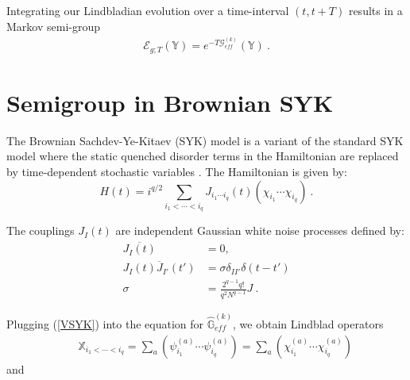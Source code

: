\documentclass{article}
\theoremstyle{definition}
\newcommand{\nn}{\nonumber}
\newcommand{\lb}{\left(}
\newcommand{\rb}{\right)}
\begin{document}
    Integrating our Lindbladian evolution over a time-interval $(t,t+T)$ results
    in a Markov semi-group
    \begin{eqnarray}
        \mathcal{E}_{g;T}(\mathbb{Y})=e^{-T\mathcal{G}_{eff}^{(k)}}(\mathbb{Y})\ .
    \end{eqnarray}

    \section{Semigroup in Brownian SYK}

    The Brownian Sachdev-Ye-Kitaev (SYK) model is a variant of the standard SYK
    model where the static quenched disorder terms in the Hamiltonian are
    replaced by time-dependent stochastic variables \cite{saad2018semiclassical}.
    The Hamiltonian is given by:
    \begin{equation}
        \label{SYKHam}H(t) = i^{q/2}\sum_{i_1<\cdots <i_q}J_{i_1\cdots i_q}(t) (\chi
        _{i_1}\cdots \chi_{i_q})\ .
    \end{equation}

    The couplings $J_{I}(t)$ are independent Gaussian white noise processes defined
    by:
    \begin{align}
        \overline{J_I(t)}            & = 0, \nonumber                      \\
        \overline{J_I(t) J_{I'}(t')} & = \sigma\delta_{II'}\delta(t-t')\nn \\
        \sigma                       & =\frac{2^{q-1}q!}{q^{2}N^{q-1}}J\ .
    \end{align}

    Plugging (\ref{VSYK}) into the equation for $\hat{\mathbb{G}}_{eff}^{(k)}$,
    we obtain Lindblad operators
    \begin{eqnarray}
        &&\mathbb{X}_{i_1<\cdots <i_q}=\sum_a (\psi_{i_1}^{(a)}\cdots \psi_{i_q}^{(a)})=\sum_a
        (\chi_{i_1}^{(a)}\cdots \chi_{i_q}^{(a)})
    \end{eqnarray}
    and
\end{document}
